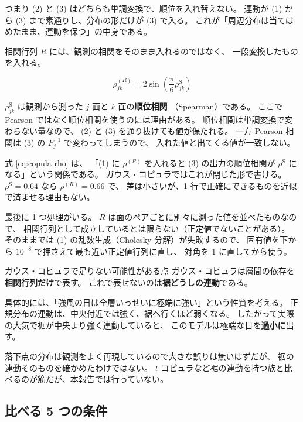 つまり (2) と (3) はどちらも単調変換で、順位を入れ替えない。
連動が (1) から (3) まで素通りし、分布の形だけが (3) で入る。
これが「周辺分布は当てはめたまま、連動を保つ」の中身である。

相関行列 $R$ には、観測の相関をそのまま入れるのではなく、
一段変換したものを入れる。

\begin{equation}
\rho^{(R)}_{jk} = 2 \sin\!\left( \frac{\pi}{6} \rho^{\mathrm{S}}_{jk} \right)
\label{eq:copula-rho}
\end{equation}

$\rho^{\mathrm{S}}_{jk}$ は観測から測った $j$ 面と $k$ 面の\textbf{順位相関}
（Spearman）である。
ここで Pearson ではなく順位相関を使うのには理由がある。
順位相関は単調変換で変わらない量なので、
(2) と (3) を通り抜けても値が保たれる。
一方 Pearson 相関は (3) の $F_j^{-1}$ で変わってしまうので、
入れた値と出てくる値が一致しない。

式 \eqref{eq:copula-rho} は、
「(1) に $\rho^{(R)}$ を入れると (3) の出力の順位相関が
$\rho^{\mathrm{S}}$ になる」という関係である。
ガウス・コピュラではこれが閉じた形で書ける。
$\rho^{\mathrm{S}} = 0.64$ なら $\rho^{(R)} = 0.66$ で、
差は小さいが、1 行で正確にできるものを近似で済ませる理由もない。

最後に 1 つ処理がいる。
$R$ は面のペアごとに別々に測った値を並べたものなので、
相関行列として成立しているとは限らない（正定値でないことがある）。
そのままでは (1) の乱数生成（Cholesky 分解）が失敗するので、
固有値を下から $10^{-8}$ で押さえて最も近い正定値行列に直し、
対角を 1 に直してから使う。

\begin{whybox}{ガウス・コピュラで足りない可能性がある点}
ガウス・コピュラは層間の依存を\textbf{相関行列だけ}で表す。
これで表せないのは\textbf{裾どうしの連動}である。

具体的には、「強風の日は全層いっせいに極端に強い」という性質を考える。
正規分布の連動は、中央付近では強く、裾へ行くほど弱くなる。
したがって実際の大気で裾が中央より強く連動していると、
このモデルは極端な日を\textbf{過小に}出す。

落下点の分布は観測をよく再現しているので大きな誤りは無いはずだが、
裾の連動そのものを確かめたわけではない。
$t$ コピュラなど裾の連動を持つ族と比べるのが筋だが、本報告では行っていない。
\end{whybox}

\subsection{比べる 5 つの条件}

